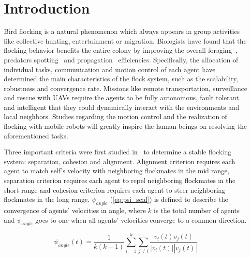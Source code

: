 \chapter{Introduction}\label{introduction}

Bird flocking is a natural phenomenon which always appears in group activities like collective hunting, entertainment or migration. Biologists have found that the flocking behavior benefits the entire colony by improving the overall foraging~\cite{Foraging}, predators spotting~\cite{Predator} and propagation~\cite{Propagation} efficiencies. Specifically, the allocation of individual tasks, communication and motion control of each agent have determined the main characteristics of the flock system, such as the scalability, robustness and convergence rate. Missions like remote transportation, surveillance and rescue with UAVs require the agents to be fully autonomous, fault tolerant and intelligent that they could dynamically interact with the environments and local neighbors. Studies regarding the motion control and the realization of flocking with mobile robots will greatly inspire the human beings on resolving the aforementioned tasks.

Three important criteria were first studied in~\cite{Reynolds1987} to determine a stable flocking system: separation, cohesion and alignment. Alignment criterion requires each agent to match self's velocity with neighboring flockmates in the mid range, separation criterion requires each agent to repel neighboring flockmates in the short range and cohesion criterion requires each agent to steer neighboring flockmates in the long range. $\psi_{angle}$ (\ref{eq:psi_scal}) is defined to describe the convergence of agents' velocities in angle, where $k$ is the total number of agents and $\psi_{angle}$ goes to one when all agents' velocities converge to a common direction.

\begin{equation}\label{eq:psi_scal}
\psi_{angle}(t)=\frac{1}{k(k-1)}\sum^k_{i=1}\sum_{j\neq i}\frac{v_i(t)v_j(t)}{|v_i(t)||v_j(t)|}
\end{equation}

